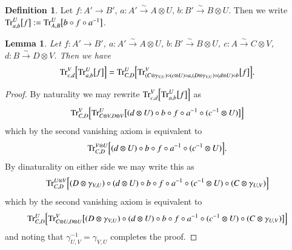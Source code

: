 \documentclass{amsart}
\def\tn{\textnormal}
\def\Trace{\tn{Tr}}
\def\to{\rightarrow}
\newcommand{\To}[1]{\xrightarrow{#1}}
\newtheorem{lemma}[subsection]{Lemma}
\theoremstyle{remark}
\theoremstyle{definition}
\newtheorem{definition}[subsection]{Definition}
\begin{document}
\begin{definition}
 Let $f:A'\to B'$, $a:A'\To{\sim} A\otimes U$, $b:B'\To{\sim} B\otimes U$.  Then we write $\Trace_{a,b}^U\big[f\big]:=\Trace_{A,B}^U\big[b\circ f\circ a^{-1}\big]$.
\end{definition}
\begin{lemma}
 Let $f:A'\to B'$, $a:A'\To{\sim} A\otimes U$, $b:B'\To{\sim} B\otimes U$, $c:A\To{\sim} C\otimes V$, $d:B\To{\sim} D\otimes V$.  Then we have
 \begin{equation}
  \Trace_{c,d}^V\Big[\Trace_{a,b}^U\big[f\big]\Big]=\Trace_{C,D}^U\Big[\Trace_{(C\otimes\gamma_{V,U})\circ(c\otimes U)\circ a,(D\otimes\gamma_{V,U})\circ(d\otimes U)\circ b}^V\big[f\big]\Big].
 \end{equation}
\end{lemma}
\begin{proof}
 By naturality we may rewrite $\Trace_{c,d}^V\Big[\Trace_{a,b}^U\big[f\big]\Big]$ as
 \[\Trace_{C,D}^V\Big[\Trace_{C\otimes V,D\otimes V}^U\big[(d\otimes U)\circ b\circ f\circ a^{-1}\circ (c^{-1}\otimes U)\big]\Big]\]
 which by the second vanishing axiom is equivalent to
 \[\Trace_{C,D}^{V\otimes U}\Big[(d\otimes U)\circ b\circ f\circ a^{-1}\circ (c^{-1}\otimes U)\Big].\]
 By dinaturality on either side we may write this as
 \[\Trace_{C,D}^{U\otimes V}\Big[(D\otimes\gamma_{V,U})\circ(d\otimes U)\circ b\circ f\circ a^{-1}\circ (c^{-1}\otimes U)\circ(C\otimes\gamma_{U,V})\Big]\]
 which by the second vanishing axiom is equivalent to
 \[\Trace_{C,D}^U\Big[\Trace_{C\otimes U,D\otimes U}^V\big[(D\otimes\gamma_{V,U})\circ(d\otimes U)\circ b\circ f\circ a^{-1}\circ (c^{-1}\otimes U)\circ(C\otimes\gamma_{U,V})\big]\Big]\]
 and noting that $\gamma_{U,V}^{-1}=\gamma_{V,U}$ completes the proof.
\end{proof}
\end{document}
